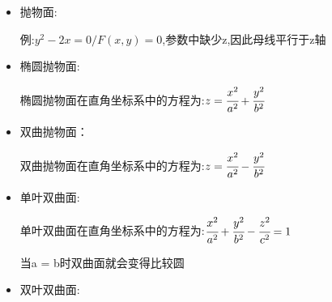 {{{\begin{itemize}
{\begin{itemize}
{                      $\cfrac{x^2}{a^2} + \cfrac{y^2}{b^2} + \cfrac{z^2}{c^2} = 1$

                      其中a和b是赤道半径(沿着x和y轴),c是极半径,(沿着z轴).这三个数都是固定的正实数，决定了椭球的形状.

                      如果三个半径都是相等的,那么就是一个球;如果有两个半径是相等的,则是一个类球面.

                      \begin{itemize}
                        \item $a = b = c$:球
                        \item $a = b > c$:扁球面
                        \item $a = b < c$:长球面
                        \item $a \neq b,b \neq c,c \neq a$:不等边椭球(三条边都不相等)
                      \end{itemize}

                      点(a,0,0)、(0,b,0)和(0,0,c)都在曲面上.从原点到这三个点的线段,称为椭球的半主轴.它们与椭圆的半长轴和半短轴相对应.

                      体积公式为:$\cfrac{4}{3}\pi abc$.

                      注意,当三个半径都相等时,这个公式便化为球的体积;两个半径相等时,便化为扁球面或长球面的体积.
                      }
                \item {
                      抛物面:

                      例:$y^2 - 2x = 0 / F(x,y) = 0$,参数中缺少z,因此母线平行于z轴
                      }
                \item {
                      椭圆抛物面:

                      椭圆抛物面在直角坐标系中的方程为:$z = \cfrac{x^2}{a^2} + \cfrac{y^2}{b^2}$
                      }
                \item {
                      双曲抛物面：

                      双曲抛物面在直角坐标系中的方程为:$z = \cfrac{x^2}{a^2} - \cfrac{y^2}{b^2}$
                      }
                \item {
                      单叶双曲面:

                      单叶双曲面在直角坐标系中的方程为:$\cfrac{x^2}{a^2} + \cfrac{y^2}{b^2} - \cfrac{z^2}{c^2} = 1$

                      当a = b时双曲面就会变得比较圆
                      }
                \item {
                      双叶双曲面:

}
\end{itemize}}
\end{itemize}}}}
